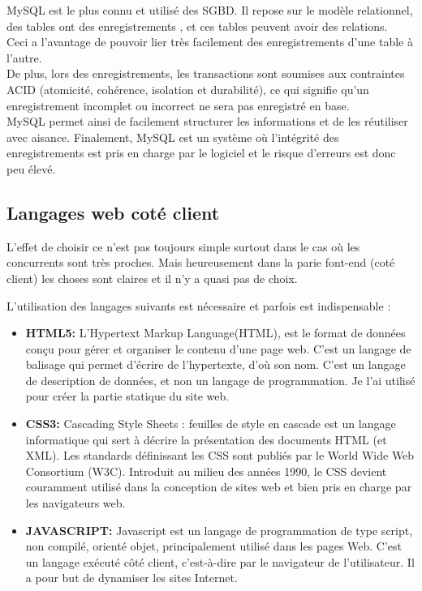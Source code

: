 \documentclass[12pt]{article}
\begin{document}
MySQL est le plus connu et utilisé des SGBD. Il repose sur le modèle relationnel, des tables ont des enregistrements , et ces tables peuvent avoir des relations.\\  Ceci a l’avantage de pouvoir lier très facilement des enregistrements d’une table à l’autre.\\  De plus, lors des enregistrements, les transactions sont soumises aux contraintes ACID (atomicité, cohérence, isolation et durabilité), ce qui signifie qu’un enregistrement incomplet ou incorrect ne sera pas enregistré en base. \\  MySQL permet ainsi de facilement structurer les informations et de les réutiliser avec aisance. Finalement, MySQL est un système où l’intégrité des enregistrements est pris en charge par le logiciel et le risque d’erreurs est donc peu élevé.


  
   

\subsection{Langages web coté client}

L'effet de choisir ce n'est pas toujours simple surtout dans le cas où les concurrents sont très proches.
Mais heureusement dans la parie font-end (coté client) les choses sont claires et il n'y a quasi pas de choix.

L'utilisation des langages suivants est nécessaire et parfois est indispensable  :
\begin{itemize}
\item \textbf{HTML5:} L’Hypertext Markup Language(HTML), est le format de données conçu pour gérer
et organiser le contenu d'une page web. C’est un langage de balisage qui
permet d’écrire de l’hypertexte, d’où son nom. C'est un langage de description
de données, et non un langage de programmation. Je l’ai utilisé pour créer la
partie statique du site web.

\item \textbf{CSS3:} Cascading Style Sheets : feuilles de style en cascade est un langage informatique
qui sert à décrire la présentation des documents HTML (et XML). Les standards
définissant les CSS sont publiés par le World Wide Web Consortium (W3C). Introduit au
milieu des années 1990, le CSS devient couramment utilisé dans la conception de sites
web et bien pris en charge par les navigateurs web.

\item \textbf{JAVASCRIPT:} Javascript est un langage de programmation de type script, non compilé, orienté
objet, principalement utilisé dans les pages Web. C’est un langage exécuté  côté client, c'est-à-dire par le navigateur de l’utilisateur. Il a pour but de dynamiser les
sites Internet.
\end{itemize}
\end{document}
